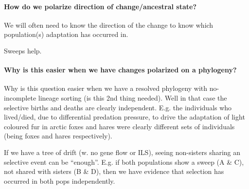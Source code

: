 \documentclass[a4paper,10pt]{article}
\begin{document}





\paragraph{How do we polarize direction of change/ancestral state? }
We will often need to know the direction of the change to know which
population(s) adaptation has occurred in.  

Sweeps help.

\paragraph{Why is this easier when we have changes polarized on a phylogeny?}

Why is this question easier when we have a resolved phylogeny with
no-incomplete lineage sorting (is this 2nd thing needed).
Well in that case the selective births and deaths are clearly
independent. E.g. the individuals who lived/died, due to differential
predation pressure, to drive the adaptation of light coloured fur in
arctic foxes and hares were clearly different sets of individuals
(being foxes and hares respectively). 



If we have a tree of drift (w. no gene flow or ILS), seeing non-sisters sharing an selective
event can be ``enough''. E.g. if both populations show a sweep (A \& C), not
shared with sisters (B \& D), then we have evidence that selection has occurred
in both pops independently. 
\end{document}
